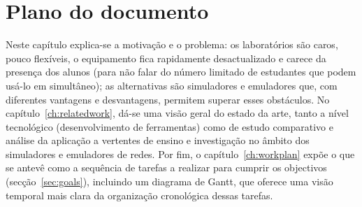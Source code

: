 \section{Plano do documento}

Neste capítulo explica-se a motivação e o problema: os laboratórios são caros, pouco flexíveis, o equipamento fica rapidamente desactualizado e carece da presença dos alunos (para não falar do número limitado de estudantes que podem usá-lo em simultâneo); as alternativas são simuladores e emuladores que, com diferentes vantagens e desvantagens, permitem superar esses obstáculos. No capítulo~\ref{ch:relatedwork}, dá-se uma visão geral do estado da arte, tanto a nível tecnológico (desenvolvimento de ferramentas) como de estudo comparativo e análise da aplicação a vertentes de ensino e investigação no âmbito dos simuladores e emuladores de redes. Por fim, o capítulo~\ref{ch:workplan} expõe o que se antevê como a sequência de tarefas a realizar para cumprir os objectivos (secção~\ref{sec:goals}), incluindo um diagrama de Gantt, que oferece uma visão temporal mais clara da organização cronológica dessas tarefas.

